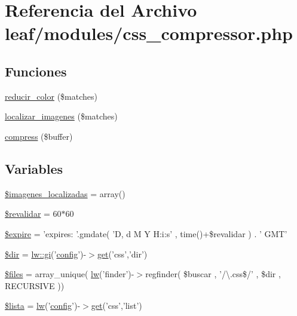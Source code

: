 \hypertarget{css__compressor_8php}{\section{Referencia del Archivo leaf/modules/css\-\_\-compressor.php}
\label{css__compressor_8php}
}
\subsection*{Funciones}
\begin{DoxyCompactItemize}
\item 
\hyperlink{css__compressor_8php_a54d76b1d86d3cee78632e8de8e8d120b}{reducir\-\_\-color} (\$matches)
\item 
\hyperlink{css__compressor_8php_a038ed1c66ff65337c153d206e6258fe8}{localizar\-\_\-imagenes} (\$matches)
\item 
\hyperlink{css__compressor_8php_aa258b37cddeda5e6637303fe9acd0604}{compress} (\$buffer)
\end{DoxyCompactItemize}
\subsection*{Variables}
\begin{DoxyCompactItemize}
\item 
\hyperlink{css__compressor_8php_a78324224a8b7bd09b0fad9bd556122df}{\$imagenes\-\_\-localizadas} = array()
\item 
\hyperlink{css__compressor_8php_aea9b3a9631ff4b34c48b0298669718d0}{\$revalidar} = 60$\ast$60
\item 
\hyperlink{css__compressor_8php_a5d0f068533ab8205b0e7cb0d19ad03d7}{\$expire} = 'expires\-: '.gmdate( 'D, d M Y H\-:i\-:s' , time()+\$revalidar ) . ' G\-M\-T'
\item 
\hyperlink{css__compressor_8php_a1659f0a629d408e0f849dbe4ee061e62}{\$dir} = \hyperlink{classlw_a2a82141a13e0594d6ebd540801a927b7}{lw\-::gi}('\hyperlink{classconfig}{config}')-\/$>$\hyperlink{classget}{get}('css','dir')
\item 
\hyperlink{css__compressor_8php_a9590b15215a21e9b42eb546aeef79704}{\$files} = array\-\_\-unique( \hyperlink{classlw}{lw}('finder')-\/$>$regfinder( \$buscar , '/\textbackslash{}.css\$/' , \$dir , R\-E\-C\-U\-R\-S\-I\-V\-E ))
\item 
\hyperlink{css__compressor_8php_ac40c8d54c9efc86d64e63bcc60447734}{\$lista} = \hyperlink{classlw}{lw}('\hyperlink{classconfig}{config}')-\/$>$\hyperlink{classget}{get}('css','list')
\end{DoxyCompactItemize}


